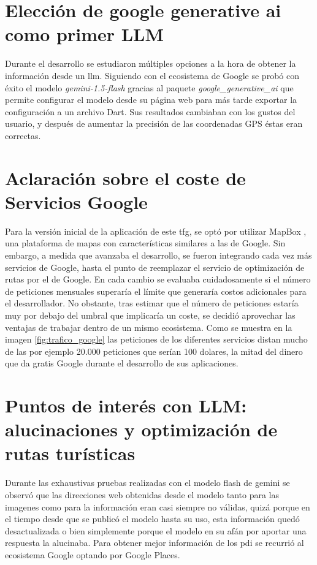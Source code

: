 \section{Elección de google generative ai como primer LLM}
Durante el desarrollo se estudiaron múltiples opciones a la hora de obtener la información desde un \acrshort{llm}. 
Siguiendo con el ecosistema de Google se probó con éxito el modelo \textit{gemini-1.5-flash} gracias al paquete \textit{google\_generative\_ai} que permite configurar el modelo desde su página web para más tarde exportar la configuración a un archivo Dart. Sus resultados cambiaban con los gustos del usuario, y después de aumentar la precisión de las coordenadas GPS éstas eran correctas.
\

\section{Aclaración sobre el coste de Servicios Google}
Para la versión inicial de la aplicación de este \acrshort{tfg}, se optó por utilizar MapBox \cite{mapbox}, una plataforma de mapas con características similares a las de Google. Sin embargo, a medida que avanzaba el desarrollo, se fueron integrando cada vez más servicios de Google, hasta el punto de reemplazar el servicio de optimización de rutas por el de Google. En cada cambio se evaluaba cuidadosamente si el número de peticiones mensuales superaría el límite que generaría costos adicionales para el desarrollador. No obstante, tras estimar que el número de peticiones estaría muy por debajo del umbral que implicaría un coste, se decidió aprovechar las ventajas de trabajar dentro de un mismo ecosistema. Como se muestra en la imagen \ref{fig:trafico_google} las peticiones de los diferentes servicios distan mucho de las por ejemplo 20.000 peticiones que serían 100 dolares, la mitad del dinero que da gratis Google durante el desarrollo de sus aplicaciones.
  
\section{Puntos de interés con LLM: alucinaciones y optimización de rutas turísticas}
Durante las exhaustivas pruebas realizadas con el modelo flash de gemini se observó que las direcciones web obtenidas desde el modelo tanto para las imagenes como para la información eran casi siempre no válidas, quizá porque en el tiempo desde que se publicó el modelo hasta su uso, esta información quedó desactualizada o bien simplemente porque el modelo en su afán por aportar una respuesta la alucinaba.
Para obtener mejor información de los \acrlong{pdi} se recurrió al ecosistema Google optando por Google Places.

